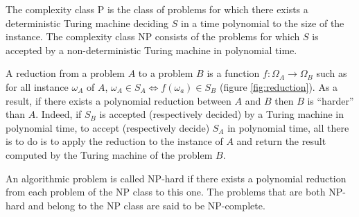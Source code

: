 The complexity class P is the class of problems for which there exists
a deterministic Turing machine deciding $S$ in a time polynomial to
the size of the instance. The complexity class NP consists of the
problems for which $S$ is accepted by a non-deterministic Turing
machine in polynomial time.

A reduction from a problem $A$ to a problem $B$ is a function
$f : \Omega_{A} \rightarrow \Omega_{B}$ such as for all instance
$\omega_{A}$ of $A$,
$\omega_{A} \in S_{A} \Leftrightarrow f(\omega_{a}) \in S_{B}$ (figure
\ref{fig:reduction}). As a result, if there exists a polynomial
reduction between $A$ and $B$ then $B$ is ``harder'' than $A$. Indeed,
if $S_{B}$ is accepted (respectively decided) by a Turing machine in
polynomial time, to accept (respectively decide) $S_{A}$ in polynomial
time, all there is to do is to apply the reduction to the instance of
$A$ and return the result computed by the Turing machine of the
problem $B$.
 
An algorithmic problem is called NP-hard if there exists a polynomial
reduction from each problem of the NP class to this one. The problems
that are both NP-hard and belong to the NP class are said to be
NP-complete.
